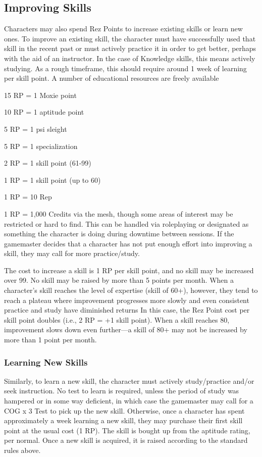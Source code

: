 \subsection{Improving Skills}

Characters may also spend Rez Points to increase 
existing skills or learn new ones. To improve an existing
skill, the character must have successfully used
that skill in the recent past or must actively practice 
it in order to get better, perhaps with the aid of an 
instructor. In the case of Knowledge skills, this means 
actively studying. As a rough timeframe, this should 
require around 1 week of learning per skill point. A 
number of educational resources are freely available 

15 RP = 1 Moxie point

10 RP = 1 aptitude point

5 RP = 1 psi sleight

  5 RP = 1 specialization

  2 RP = 1 skill point (61-99)

  1 RP = 1 skill point (up to 60)

  1 RP = 10 Rep

  1 RP = 1,000 Credits
via the mesh, though some areas of interest 
may be restricted or hard to find. This can 
be handled via roleplaying or designated 
as something the character is doing during 
downtime between sessions. If the gamemaster
decides that a character has not put
enough effort into improving a skill, they 
may call for more practice/study. 

The cost to increase a skill is 1 RP per skill 
point, and no skill may be increased over 99. 
No skill may be raised by more than 5 points 
per month. When a character's skill reaches 
the level of expertise (skill of 60+), however, 
they tend to reach a plateau where improvement
progresses more slowly and even consistent
practice and study have diminished returns
In this case, the Rez Point cost per skill
point doubles (i.e., 2 RP = +1 skill point). 
When a skill reaches 80, improvement slows 
down even further—a skill of 80+ may not 
be increased by more than 1 point per month.

\subsubsection{Learning New Skills}

Similarly, to learn a new skill, the character 
must actively study/practice and/or seek 
instruction. No test to learn is required, 
unless the period of study was hampered 
or in some way deficient, in which case the 
gamemaster may call for a COG x 3 Test 
to pick up the new skill. Otherwise, once a 
character has spent approximately a week 
learning a new skill, they may purchase their 
first skill point at the usual cost (1 RP). The 
skill is bought up from the aptitude rating, 
per normal. Once a new skill is acquired, it is 
raised according to the standard rules above.

